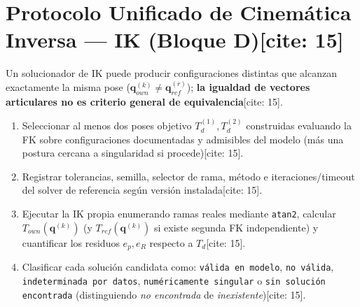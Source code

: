 \documentclass[10pt, a4paper]{article}
\begin{document}
\section{Protocolo Unificado de Cinemática Inversa — IK (Bloque D)[cite: 15]}
Un solucionador de IK puede producir configuraciones distintas que alcanzan exactamente la misma pose ($\mathbf{q}_{own}^{(k)} \neq \mathbf{q}_{ref}^{(r)}$); \textbf{la igualdad de vectores articulares no es criterio general de equivalencia}[cite: 15].
\begin{enumerate}
    \item Seleccionar al menos dos poses objetivo $T_d^{(1)}, T_d^{(2)}$ construidas evaluando la FK sobre configuraciones documentadas y admisibles del modelo (más una postura cercana a singularidad si procede)[cite: 15].
    \item Registrar tolerancias, semilla, selector de rama, método e iteraciones/timeout del solver de referencia según versión instalada[cite: 15].
    \item Ejecutar la IK propia enumerando ramas reales mediante \texttt{atan2}, calcular $T_{own}(\mathbf{q}^{(k)})$ (y $T_{ref}(\mathbf{q}^{(k)})$ si existe segunda FK independiente) y cuantificar los residuos $e_p, e_R$ respecto a $T_d$[cite: 15].
    \item Clasificar cada solución candidata como: \texttt{válida en modelo}, \texttt{no válida}, \texttt{indeterminada por datos}, \texttt{numéricamente singular} o \texttt{sin solución encontrada} (distinguiendo \textit{no encontrada} de \textit{inexistente})[cite: 15].
\end{enumerate}

\end{document}
